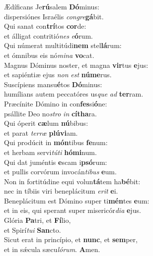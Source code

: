 \evenverse Ædíficans Je\textbf{rú}salem \textbf{Dó}minus:~\*\\
\evenverse dispersiónes Israélis \textit{con}\textit{gre}\textbf{gá}bit.\\
\oddverse Qui sanat con\textbf{trí}tos \textbf{cor}de:~\*\\
\oddverse et álligat contritió\textit{nes} \textit{e}\textbf{ó}rum.\\
\evenverse Qui númerat multitúdi\textbf{nem} stel\textbf{lá}rum:~\*\\
\evenverse et ómnibus eis nó\textit{mi}\textit{na} \textbf{vo}cat.\\
\oddverse Magnus Dóminus noster, et magna \textbf{vir}tus \textbf{e}jus:~\*\\
\oddverse et sapiéntiæ ejus \textit{non} \textit{est} \textbf{nú}\textbf{me}rus.\\
\evenverse Suscípiens mansu\textbf{é}tos \textbf{Dó}minus:~\*\\
\evenverse humílians autem peccatóres us\textit{que} \textit{ad} \textbf{ter}ram.\\
\oddverse Præcínite Dómino in con\textbf{fes}si\textbf{ó}ne:~\*\\
\oddverse psállite Deo no\textit{stro} \textit{in} \textbf{cí}\textbf{tha}ra.\\
\evenverse Qui óperit \textbf{cæ}lum \textbf{nú}bibus:~\*\\
\evenverse et parat \textit{ter}\textit{ræ} \textbf{plú}\textbf{vi}am.\\
\oddverse Qui prodúcit in \textbf{món}tibus \textbf{fe}num:~\*\\
\oddverse et herbam servi\textit{tú}\textit{ti} \textbf{hó}\textbf{mi}num.\\
\evenverse Qui dat juméntis \textbf{e}scam i\textbf{psó}rum:~\*\\
\evenverse et pullis corvórum invocán\textit{ti}\textit{bus} \textbf{e}um.\\
\oddverse Non in fortitúdine equi volun\textbf{tá}tem ha\textbf{bé}bit:~\*\\
\oddverse nec in tíbiis viri beneplácitum \textit{e}\textit{rit} \textbf{e}i.\\
\evenverse Beneplácitum est Dómino super ti\textbf{mén}tes \textbf{e}um:~\*\\
\evenverse et in eis, qui sperant super misericór\textit{di}\textit{a} \textbf{e}jus.\\
\oddverse Glória \textbf{Pa}tri, et \textbf{Fí}lio,~\*\\
\oddverse et Spirí\textit{tu}\textit{i} \textbf{San}cto.\\
\evenverse Sicut erat in princípio, et \textbf{nunc}, et \textbf{sem}per,~\*\\
\evenverse et in sǽcula sæcu\textit{ló}\textit{rum}. \textbf{A}men.\\
